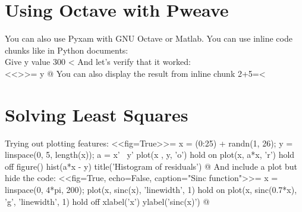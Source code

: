 \documentclass[12pt]{exam}
\begin{document}
        \section*{Using Octave with Pweave}
            You can also use Pyxam with GNU Octave or Matlab. You can use inline code chunks like in Python documents: \\
            Give y value 300 <%
            And let's verify that it worked: \\
<<>>=
y
@
            You can also display the result from inline chunk 2+5=<%
        \section*{Solving Least Squares}
            Trying out plotting features:
<<fig=True>>=
x = (0:25) + randn(1, 26);
y = linspace(0, 5, length(x));
a = x' \ y'
plot(x , y, 'o')
hold on
plot(x, a*x, 'r')
hold off
figure()
hist(a*x - y)
title('Histogram of residuals')
@
            And include a plot but hide the code:
<<fig=True, echo=False, caption="Sinc function">>=
x = linspace(0, 4*pi, 200);
plot(x, sinc(x), 'linewidth', 1)
hold on
plot(x, sinc(0.7*x), 'g', 'linewidth', 1)
hold off
xlabel('x')
ylabel('sinc(x)')
@
\end{document}
